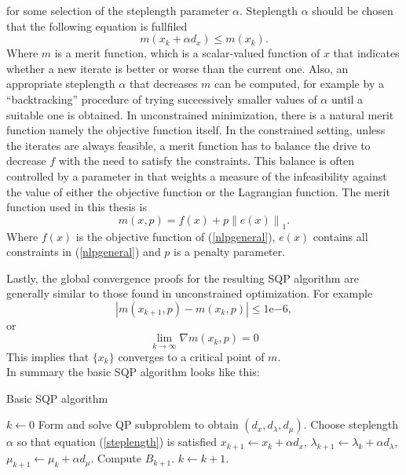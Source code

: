 for some selection of the steplength parameter $\alpha$. Steplength $\alpha$ should be chosen that the following equation is fullfiled
\begin{equation}\label{steplength}
	m(x_k + \alpha d_x)\leq m(x_k).
\end{equation}
Where $m$ is a merit function, which is a scalar-valued function of $x$ that indicates whether a new iterate is better or worse than the current one. Also, an appropriate steplength $\alpha$ that decreases $m$ can be computed, for example by a ``backtracking'' procedure of trying successively smaller values of $\alpha$ until a suitable one is obtained. In unconstrained minimization, there is a natural merit function namely the objective function itself. In the constrained setting, unless the iterates are always feasible, a merit function has to balance the drive to decrease $f$ with the need to satisfy the constraints. This balance is often controlled by a parameter in that weights a measure of the infeasibility against the value of either the objective function or the Lagrangian function. The merit function used in this thesis is
\begin{equation}
m(x,p) = f(x) + p\left\|e(x)\right\|_1.
\end{equation}
Where $f(x)$ is the objective function of (\ref{nlpgeneral}), $e(x)$ contains all constraints in (\ref{nlpgeneral}) and $p$ is a penalty parameter.

Lastly, the global convergence proofs for the resulting SQP algorithm are generally similar to those found in unconstrained optimization. For example 
\begin{equation}
	|m(x_{k+1},p) - m(x_{k},p)|\leq 1\mathrm{e}{-6},
\end{equation}
or
\begin{equation}
	\lim_{k\to\infty} \nabla m(x_{k},p) = 0
\end{equation}
This implies that $\{x_k\}$ converges to a critical point of $m$.\\

In summary the basic SQP algorithm looks like this:

\begin{algorithm}[H]
	\caption{Basic SQP algorithm}\label{SQP:algorithm}
	\begin{algorithmic}[1]
	\State $k\gets 0$
	\State Form and solve QP subproblem to obtain $(d_x,d_\lambda,d_\mu)$.
	\State Choose steplength $\alpha$ so that equation (\ref{steplength}) is satisfied
	\State 	$x_{k+1} \gets x_k + \alpha d_x$,
	\State $\lambda_{k+1} \gets \lambda_k + \alpha d_\lambda$,
	\State $\mu_{k+1} \gets \mu_k + \alpha d_\mu$.
	\State Compute $B_{k+1}$.
	\State $k \gets k+1$.
	\EndWhile
	\EndProcedure	
	\end{algorithmic}
\end{algorithm}	